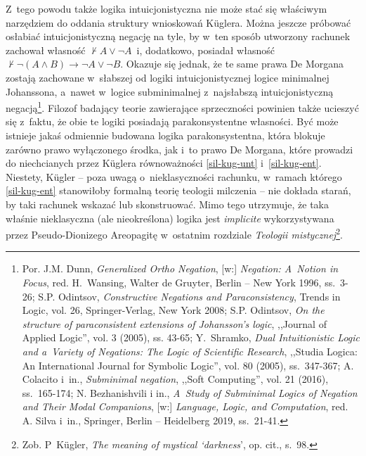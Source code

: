 Z~tego powodu także logika intuicjonistyczna nie może stać się właściwym narzędziem do oddania struktury wnioskowań Küglera. Można jeszcze próbować osłabiać intuicjonistyczną negację na tyle, by w~ten sposób utworzony rachunek zachował własność $\nvdash A \lor \neg A$~i, dodatkowo, posiadał własność $\nvdash \neg (A \land B) \to \neg A \lor \neg B$. Okazuje się jednak, że te same prawa De Morgana zostają zachowane w~słabszej od logiki intuicjonistycznej logice minimalnej Johanssona, a~nawet w~logice subminimalnej z~najsłabszą intuicjonistyczną negacją\footnote{Por. J.M. Dunn, \textit{Generalized Ortho Negation}, [w:] \textit{Negation: A~Notion in Focus}, red. H.~Wansing, Walter de Gruyter, Berlin -- New York 1996, ss.~3-26; S.P. Odintsov, \textit{Constructive Negations and Paraconsistency}, Trends in Logic, vol. 26, Springer-Verlag, New York 2008; S.P. Odintsov, \textit{On the structure of paraconsistent extensions of Johansson's logic}, ,,Journal of Applied Logic'', vol. 3 (2005), ss. 43-65; Y.~Shramko, \textit{Dual Intuitionistic Logic and a~Variety of Negations: The Logic of Scientific Research}, ,,Studia Logica: An International Journal for Symbolic Logic'', vol. 80 (2005), ss.~347-367; A. Colacito i~in., \textit{Subminimal negation}, ,,Soft Computing'', vol. 21 (2016), ss.~165-174; N. Bezhanishvili i in., \textit{A~Study of Subminimal Logics of Negation and Their Modal Companions}, [w:] \textit{Language, Logic, and Computation}, red. A. Silva i~in., Springer, Berlin -- Heidelberg 2019, ss.~21-41.}. Filozof badający teorie zawierające sprzeczności powinien także ucieszyć się z~faktu, że obie te logiki posiadają parakonsystentne własności. Być może istnieje jakaś odmiennie budowana logika parakonsystentna, która blokuje zarówno prawo wyłączonego środka, jak i~to prawo De Morgana, które prowadzi do niechcianych przez Küglera równoważności \ref{sil-kug-unt} i~\ref{sil-kug-ent}. Niestety, Kügler -- poza uwagą o~nieklasyczności rachunku, w~ramach którego \ref{sil-kug-ent} stanowiłoby formalną teorię teologii milczenia -- nie dokłada starań, by taki rachunek wskazać lub skonstruować. Mimo tego utrzymuje, że taka właśnie nieklasyczna (ale nieokreślona) logika jest \textit{implicite} wykorzystywana przez Pseudo-Dionizego Areopagitę w~ostatnim rozdziale \textit{Teologii mistycznej}\footnote{Zob. P~Kügler, \textit{The meaning of mystical ‘darkness}', op. cit., s.~98.}.

